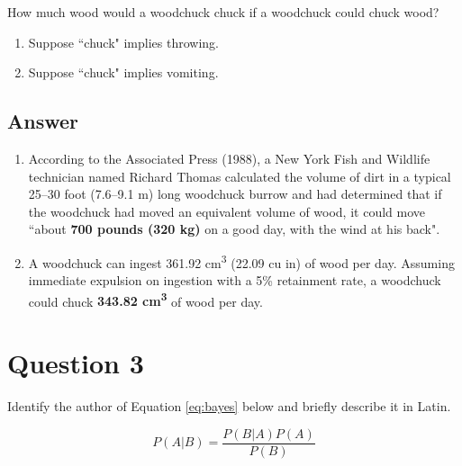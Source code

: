 \documentclass[
	12pt, %
]{fphw}
\begin{document}
\begin{problem}
	How much wood would a woodchuck chuck if a woodchuck could chuck wood?
	
	\medskip
	
	\begin{enumerate} %
		\item Suppose ``chuck" implies throwing.
		\item Suppose ``chuck" implies vomiting.
	\end{enumerate}
\end{problem}


\subsection*{Answer}

\begin{enumerate} %
	\item According to the Associated Press (1988), a New York Fish and Wildlife technician named Richard Thomas calculated the volume of dirt in a typical 25--30 foot (7.6--9.1 m) long woodchuck burrow and had determined that if the woodchuck had moved an equivalent volume of wood, it could move ``about \textbf{700 pounds (320 kg)} on a good day, with the wind at his back".
    
	\item A woodchuck can ingest 361.92 cm\textsuperscript{3} (22.09 cu in) of wood per day. Assuming immediate expulsion on ingestion with a 5\% retainment rate, a woodchuck could chuck \textbf{343.82 cm\textsuperscript{3}} of wood per day.
\end{enumerate}


\section*{Question 3}

\begin{problem}
	Identify the author of Equation \ref{eq:bayes} below and briefly describe it in Latin.
	
	\medskip
	
	\begin{equation}\label{eq:bayes}
		P(A|B) = \frac{P(B|A)P(A)}{P(B)}
	\end{equation}
	
	\smallskip
\end{problem}
\end{document}
